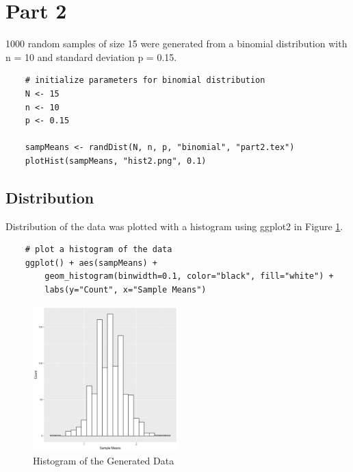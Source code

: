 \documentclass[paper=a4, fontsize=11pt]{article}
\begin{document}
    \section{Part 2}
        1000 random samples of size 15 were generated from a binomial distribution with n = 10 and standard deviation p = 0.15.

\begin{lstlisting}
    # initialize parameters for binomial distribution
    N <- 15
    n <- 10
    p <- 0.15

    sampMeans <- randDist(N, n, p, "binomial", "part2.tex")
    plotHist(sampMeans, "hist2.png", 0.1)
\end{lstlisting}

        

        \subsection{Distribution}
            Distribution of the data was plotted with a histogram using ggplot2 in Figure \ref{fig:hist2}.
\begin{lstlisting}
    # plot a histogram of the data
    ggplot() + aes(sampMeans) + 
        geom_histogram(binwidth=0.1, color="black", fill="white") +
        labs(y="Count", x="Sample Means")
\end{lstlisting}

            \begin{figure}[h!]
                \begin{center}
                    \includegraphics[width=0.5\textwidth]{figures/hist2.png}
                    \caption{Histogram of the Generated Data} \label{fig:hist2}
                \end{center}
            \end{figure}
\end{document}
